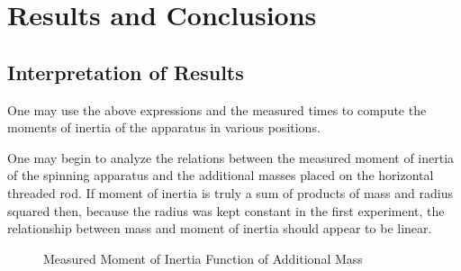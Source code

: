 \documentclass[11pt]{article}
\begin{document}
\section{Results and Conclusions}
\subsection{Interpretation of Results}
One may use the above expressions and the measured times to compute the moments of inertia of the apparatus in various positions.

One may begin to analyze the relations between the measured moment of inertia of the spinning apparatus and the additional masses placed on the horizontal threaded rod. If moment of inertia is truly a sum of products of mass and radius squared then, because the radius was kept constant in the first experiment, the relationship between mass and moment of inertia should appear to be linear.
\begin{figure}[h]
\centering
\caption{Measured Moment of Inertia Function of Additional Mass}
\end{figure}
\end{document}
